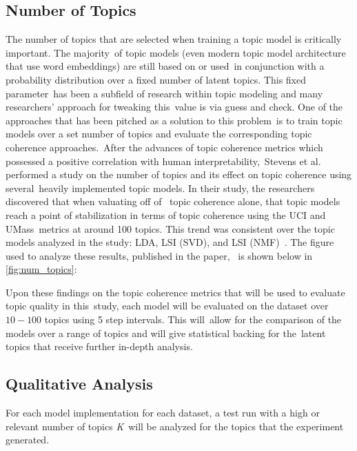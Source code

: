 \documentclass[letterpaper,12pt]{article}
\begin{document}
\subsection{Number of Topics}
The number of topics that are selected when training a topic model is critically important. The majority\
of topic models (even modern topic model architecture that use word embeddings) are still based on or used\
in conjunction with a probability distribution over a fixed number of latent topics. This fixed parameter\
has been a subfield of research within topic modeling and many researchers' approach for tweaking this\
value is via guess and check. One of the approaches that has been pitched as a solution to this problem\
is to train topic models over a set number of topics and evaluate the corresponding topic coherence approaches.\
After the advances of topic coherence metrics which possessed a positive correlation with human interpretability,\
Stevens et al. performed a study on the number of topics and its effect on topic coherence using several\
heavily implemented topic models. In their study, the researchers discovered that when valuating off of \
topic coherence alone, that topic models reach a point of stabilization in terms of topic coherence using the UCI and UMass\
metrics at around 100 topics. This trend was consistent over the topic models analyzed in the study: LDA, LSI (SVD), and LSI (NMF)\
\cite{stevens2012exploring}. The figure used to analyze these results, published in the paper, \
is shown below in \ref{fig:num_topics}:


Upon these findings on the topic coherence metrics that will be used to evaluate topic quality in this\
study, each model will be evaluated on the dataset over $10-100$ topics using 5 step intervals. This will\
allow for the comparison of the models over a range of topics and will give statistical backing for the\
latent topics that receive further in-depth analysis.

\subsection{Qualitative Analysis}
For each model implementation for each dataset, a test run with a high or relevant number of topics \emph{K}\
will be analyzed for the topics that the experiment generated.
\end{document}
